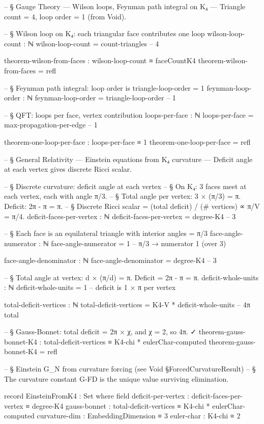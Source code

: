 \documentclass[11pt,a4paper]{book}
\begin{document}
\begin{code}
-- § Gauge Theory — Wilson loops, Feynman path integral on K₄ — Triangle count = 4, loop order = 1 (from Void).

-- § Wilson loop on K₄: each triangular face contributes one loop
wilson-loop-count : ℕ
wilson-loop-count = count-triangles  -- 4

theorem-wilson-from-faces : wilson-loop-count ≡ faceCountK4
theorem-wilson-from-faces = refl

-- § Feynman path integral: loop order is triangle-loop-order = 1
feynman-loop-order : ℕ
feynman-loop-order = triangle-loop-order  -- 1

-- § QFT: loops per face, vertex contribution
loops-per-face : ℕ
loops-per-face = max-propagation-per-edge  -- 1

theorem-one-loop-per-face : loops-per-face ≡ 1
theorem-one-loop-per-face = refl

-- § General Relativity — Einstein equations from K₄ curvature — Deficit angle at each vertex gives discrete Ricci scalar.

-- § Discrete curvature: deficit angle at each vertex
-- § On K₄: 3 faces meet at each vertex, each with angle π/3.
-- § Total angle per vertex: 3 × (π/3) = π.  Deficit: 2π - π = π.
-- § Discrete Ricci scalar = (total deficit) / (# vertices) ∝ π/V = π/4.
deficit-faces-per-vertex : ℕ
deficit-faces-per-vertex = degree-K4  -- 3

-- § Each face is an equilateral triangle with interior angles = π/3
face-angle-numerator : ℕ
face-angle-numerator = 1  -- π/3 → numerator 1 (over 3)

face-angle-denominator : ℕ
face-angle-denominator = degree-K4  -- 3

-- § Total angle at vertex: d × (π/d) = π. Deficit = 2π - π = π.
deficit-whole-units : ℕ
deficit-whole-units = 1  -- deficit is 1 × π per vertex

total-deficit-vertices : ℕ
total-deficit-vertices = K4-V * deficit-whole-units  -- 4π total

-- § Gauss-Bonnet: total deficit = 2π × χ, and χ = 2, so 4π. ✓
theorem-gauss-bonnet-K4 : total-deficit-vertices ≡ K4-chi * eulerChar-computed
theorem-gauss-bonnet-K4 = refl

-- § Einstein G_N from curvature forcing (see Void §ForcedCurvatureResult)
-- § The curvature constant G-FD is the unique value surviving elimination.

record EinsteinFromK4 : Set where
  field
    deficit-per-vertex : deficit-faces-per-vertex ≡ degree-K4
    gauss-bonnet : total-deficit-vertices ≡ K4-chi * eulerChar-computed
    curvature-dim : EmbeddingDimension ≡ 3
    euler-char : K4-chi ≡ 2


\end{code}
\end{document}
